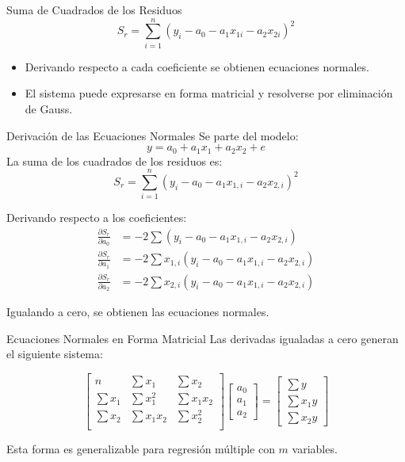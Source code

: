 \documentclass[main.tex]{subfiles}
\begin{document}
\begin{frame}{Suma de Cuadrados de los Residuos}
  \[
    S_r = \sum_{i=1}^{n} (y_i - a_0 - a_1 x_{1i} - a_2 x_{2i})^2
  \]
  \begin{itemize}
    \item Derivando respecto a cada coeficiente se obtienen ecuaciones normales.
    \item El sistema puede expresarse en forma matricial y resolverse por eliminación de Gauss.
  \end{itemize}
\end{frame}
\begin{frame}{Derivación de las Ecuaciones Normales}
  \small
  Se parte del modelo:
  \[
    y = a_0 + a_1 x_1 + a_2 x_2 + e
  \]
  La suma de los cuadrados de los residuos es:
  \[
    S_r = \sum_{i=1}^n \left( y_i - a_0 - a_1 x_{1,i} - a_2 x_{2,i} \right)^2
  \]

  Derivando respecto a los coeficientes:
  \[
  \begin{aligned}
    \frac{\partial S_r}{\partial a_0} &= -2 \sum (y_i - a_0 - a_1 x_{1,i} - a_2 x_{2,i}) \\
    \frac{\partial S_r}{\partial a_1} &= -2 \sum x_{1,i}(y_i - a_0 - a_1 x_{1,i} - a_2 x_{2,i}) \\
    \frac{\partial S_r}{\partial a_2} &= -2 \sum x_{2,i}(y_i - a_0 - a_1 x_{1,i} - a_2 x_{2,i})
  \end{aligned}
  \]

  Igualando a cero, se obtienen las ecuaciones normales.
\end{frame}

\begin{frame}{Ecuaciones Normales en Forma Matricial}
  \small
  Las derivadas igualadas a cero generan el siguiente sistema:

  \[
  \begin{bmatrix}
    n & \sum x_1 & \sum x_2 \\
    \sum x_1 & \sum x_1^2 & \sum x_1 x_2 \\
    \sum x_2 & \sum x_1 x_2 & \sum x_2^2 \\
  \end{bmatrix}
  \begin{bmatrix}
    a_0 \\ a_1 \\ a_2
  \end{bmatrix}
  =
  \begin{bmatrix}
    \sum y \\ \sum x_1 y \\ \sum x_2 y
  \end{bmatrix}
  \]

  \vspace{1em}
  Esta forma es generalizable para regresión múltiple con \(m\) variables.
\end{frame}
\end{document}

